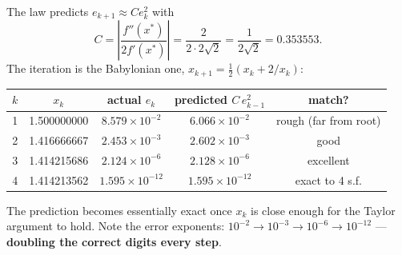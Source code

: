 \begin{probbox}
\ans The law predicts $e_{k+1}\approx C e_k^2$ with
\[
C = \left|\frac{f''(x^\ast)}{2f'(x^\ast)}\right| = \frac{2}{2\cdot 2\sqrt2} = \frac{1}{2\sqrt2} = 0.353553 .
\]
The iteration is the Babylonian one, $x_{k+1} = \tfrac12(x_k + 2/x_k)$:
\begin{center}\small
\begin{tabular}{@{}ccccc@{}}
\toprule
$k$ & $x_k$ & actual $e_k$ & predicted $C\,e_{k-1}^2$ & match?\\
\midrule
1 & 1.500000000 & $8.579\times10^{-2}$ & $6.066\times10^{-2}$ & rough (far from root)\\
2 & 1.416666667 & $2.453\times10^{-3}$ & $2.602\times10^{-3}$ & good\\
3 & 1.414215686 & $2.124\times10^{-6}$ & $2.128\times10^{-6}$ & excellent\\
4 & 1.414213562 & $1.595\times10^{-12}$ & $1.595\times10^{-12}$ & exact to 4 s.f.\\
\bottomrule
\end{tabular}
\end{center}
The prediction becomes essentially exact once $x_k$ is close enough for the Taylor argument to hold. Note the error exponents: $10^{-2}\to10^{-3}\to10^{-6}\to10^{-12}$ --- \textbf{doubling the correct digits every step}.
\end{probbox}

